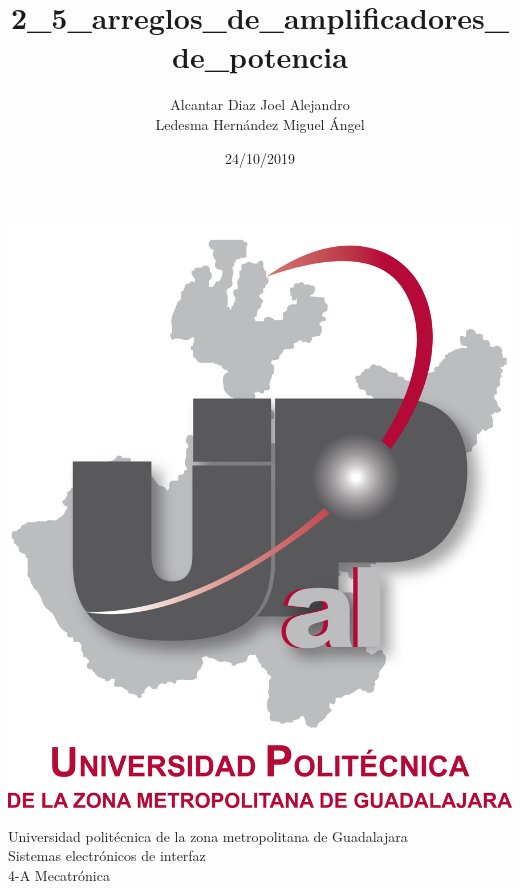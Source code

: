 \documentclass[letterpaper]{article}
\title{2\_5\_arreglos\_de\_amplificadores\_de\_potencia}
\author{Alcantar Diaz Joel Alejandro\\Ledesma Hernández Miguel Ángel}
\date{24/10/2019}
\begin{document}
\maketitle
\begin{center}
\begin{large}
\vspace{2cm}
    \begin{center}
        \includegraphics[scale=0.5]{IMG/UPZMGlog.png}
    \end{center}
\vspace{2cm}
Universidad politécnica de la zona metropolitana de Guadalajara\\
Sistemas electrónicos de interfaz\\
4-A Mecatrónica\\
\end{large}
\end{center}
\end{document}
